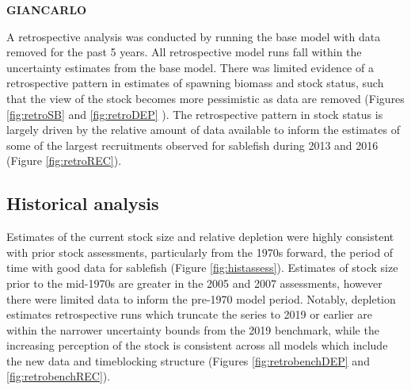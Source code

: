\documentclass[11pt,
  english,
  a4paper,
]{article}
\begin{document}
\leavevmode\tagmcend\tagstructend


\textbf{GIANCARLO}

\leavevmode\tagmcend\tagstructend\par


A retrospective analysis was conducted by running the base model with data removed for the past 5 years. All retrospective model runs fall within the uncertainty estimates from the base model. There was limited evidence of a retrospective pattern in estimates of spawning biomass and stock status, such that the view of the stock becomes more pessimistic as data are removed (Figures \ref{fig:retroSB} and \ref{fig:retroDEP} ). The retrospective pattern in stock status is largely driven by the relative amount of data available to inform the estimates of some of the largest recruitments observed for sablefish during 2013 and 2016 (Figure \ref{fig:retroREC}).

\leavevmode\tagmcend\tagstructend\par


\hypertarget{historical-analysis}{%
\subsection{Historical analysis}\label{historical-analysis}}

\leavevmode\tagmcend\tagstructend


Estimates of the current stock size and relative depletion were highly consistent with prior stock assessments, particularly from the 1970s forward, the period of time with good data for sablefish (Figure \ref{fig:histassess}). Estimates of stock size prior to the mid-1970s are greater in the 2005 and 2007 assessments, however there were limited data to inform the pre-1970 model period. Notably, depletion estimates retrospective runs which truncate the series to 2019 or earlier are within the narrower uncertainty bounds from the 2019 benchmark, while the increasing perception of the stock is consistent across all models which include the new data and timeblocking structure (Figures \ref{fig:retrobenchDEP} and \ref{fig:retrobenchREC}).

\leavevmode\tagmcend\tagstructend\par
\end{document}
